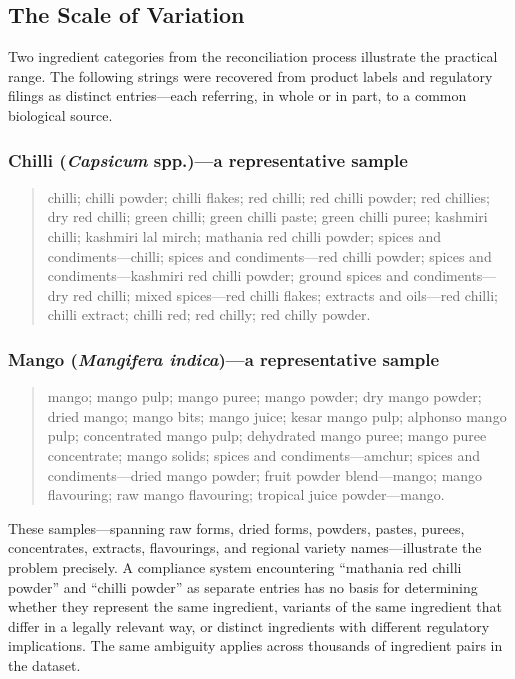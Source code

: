 \documentclass[12pt,a3paper]{article}
\begin{document}
\subsection{The Scale of Variation}

Two ingredient categories from the reconciliation process illustrate the practical range. The following strings were recovered from product labels and regulatory filings as distinct entries---each referring, in whole or in part, to a common biological source.

\subsubsection*{Chilli (\textit{Capsicum} spp.)---a representative sample}

\begin{quote}
\small
chilli; chilli powder; chilli flakes; red chilli; red chilli powder; red chillies; dry red chilli; green chilli; green chilli paste; green chilli puree; kashmiri chilli; kashmiri lal mirch; mathania red chilli powder; spices and condiments---chilli; spices and condiments---red chilli powder; spices and condiments---kashmiri red chilli powder; ground spices and condiments---dry red chilli; mixed spices---red chilli flakes; extracts and oils---red chilli; chilli extract; chilli red; red chilly; red chilly powder.
\end{quote}

\subsubsection*{Mango (\textit{Mangifera indica})---a representative sample}

\begin{quote}
\small
mango; mango pulp; mango puree; mango powder; dry mango powder; dried mango; mango bits; mango juice; kesar mango pulp; alphonso mango pulp; concentrated mango pulp; dehydrated mango puree; mango puree concentrate; mango solids; spices and condiments---amchur; spices and condiments---dried mango powder; fruit powder blend---mango; mango flavouring; raw mango flavouring; tropical juice powder---mango.
\end{quote}

These samples---spanning raw forms, dried forms, powders, pastes, purees, concentrates, extracts, flavourings, and regional variety names---illustrate the problem precisely. A compliance system encountering ``mathania red chilli powder'' and ``chilli powder'' as separate entries has no basis for determining whether they represent the same ingredient, variants of the same ingredient that differ in a legally relevant way, or distinct ingredients with different regulatory implications. The same ambiguity applies across thousands of ingredient pairs in the dataset.
\end{document}
